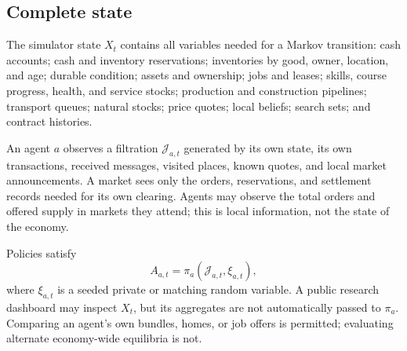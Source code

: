 \documentclass[10pt,a4paper,twocolumn]{article}
\begin{document}
\subsection{Complete state}
The simulator state $X_t$ contains all variables needed for a Markov
transition: cash accounts; cash and inventory reservations; inventories
by good, owner, location, and age; durable condition; assets and ownership;
jobs and leases; skills, course progress, health, and service stocks;
production and construction pipelines; transport queues; natural stocks;
price quotes; local beliefs; search sets; and contract histories.

An agent $a$ observes a filtration $\mathcal J_{a,t}$ generated by its
own state, its own transactions, received messages, visited places, known
quotes, and local market announcements. A market sees only the orders,
reservations, and settlement records needed for its own clearing. Agents
may observe the total orders and offered supply in markets they attend;
this is local information, not the state of the economy.

Policies satisfy
\begin{equation}
 A_{a,t}=\pi_a(\mathcal J_{a,t},\xi_{a,t}),
 \label{eq:policy}
\end{equation}
where $\xi_{a,t}$ is a seeded private or matching random variable. A public
research dashboard may inspect $X_t$, but its aggregates are not
automatically passed to $\pi_a$. Comparing an agent's own bundles, homes,
or job offers is permitted; evaluating alternate economy-wide equilibria
is not.
\end{document}
